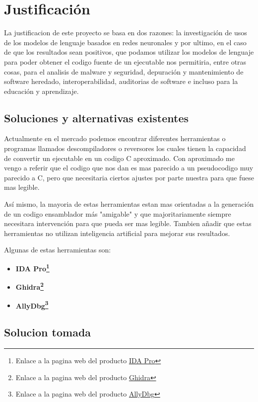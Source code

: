 \chapter{Justificación}
\label{cap:justificacion}

La justificacion de este proyecto se basa en dos razones: la investigación de usos de los modelos de lenguaje basados en redes neuronales y por ultimo,
en el caso de que los resultados sean positivos, que podamos utilizar los modelos de lenguaje para poder obtener el codigo fuente de un ejecutable nos
permitiria, entre otras cosas, para el analisis de malware y seguridad, depuración y mantenimiento de software heredado, interoperabilidad, auditorias 
de software e incluso para la educación y aprendizaje.

\section{Soluciones y alternativas existentes}
\label{sec:alternativas}

Actualmente en el mercado podemos encontrar diferentes herramientas o programas llamados descompiladores o reversores los cuales tienen la capacidad de convertir un ejecutable
en un codigo C aproximado. Con aproximado me vengo a referir que el codigo que nos dan es mas parecido a un pseudocodigo muy parecido a C, pero que necesitaria ciertos ajustes
por parte nuestra para que fuese mas legible.

Así mismo, la mayoria de estas herramientas estan mas orientadas a la generación de un codigo ensamblador más "amigable" y que majoritariamente siempre necesitara intervención
para que pueda ser mas legible. Tambien añadir que estas herramientas no utilizan inteligencia artificial para mejorar sus resultados.

Algunas de estas herramientas son:

\begin{itemize}
    \item \bf IDA Pro\footnote{Enlace a la pagina web del producto \href{https://hex-rays.com/ida-pro/}{IDA Pro}}
    \item \bf Ghidra\footnote{Enlace a la pagina web del producto \href{https://ghidra-sre.org/}{Ghidra}}
    \item \bf AllyDbg\footnote{Enlace a la pagina web del producto \href{https://www.ollydbg.de/}{AllyDbg}}
\end{itemize}

\section{Solucion tomada}
\label{sec:solucion}

